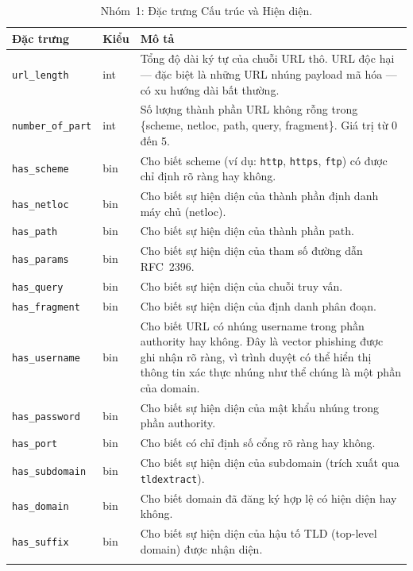 \documentclass[a4paper,12pt]{article}
\begin{document}
\begin{longtable}{p{4.5cm}p{1.5cm}p{7cm}}
\toprule
\textbf{Đặc trưng} & \textbf{Kiểu} & \textbf{Mô tả} \\
\midrule
\endhead
\texttt{url\_length}       & int   & Tổng độ dài ký tự của chuỗi URL thô. URL độc hại --- đặc biệt là những URL nhúng payload mã hóa --- có xu hướng dài bất thường. \\
\texttt{number\_of\_part}  & int   & Số lượng thành phần URL không rỗng trong \{scheme, netloc, path, query, fragment\}. Giá trị từ 0 đến 5. \\
\texttt{has\_scheme}       & bin   & Cho biết scheme (ví dụ: \texttt{http}, \texttt{https}, \texttt{ftp}) có được chỉ định rõ ràng hay không. \\
\texttt{has\_netloc}       & bin   & Cho biết sự hiện diện của thành phần định danh máy chủ (netloc). \\
\texttt{has\_path}         & bin   & Cho biết sự hiện diện của thành phần path. \\
\texttt{has\_params}       & bin   & Cho biết sự hiện diện của tham số đường dẫn RFC~2396. \\
\texttt{has\_query}        & bin   & Cho biết sự hiện diện của chuỗi truy vấn. \\
\texttt{has\_fragment}     & bin   & Cho biết sự hiện diện của định danh phân đoạn. \\
\texttt{has\_username}     & bin   & Cho biết URL có nhúng username trong phần authority hay không. Đây là vector phishing được ghi nhận rõ ràng, vì trình duyệt có thể hiển thị thông tin xác thực nhúng như thể chúng là một phần của domain. \\
\texttt{has\_password}     & bin   & Cho biết sự hiện diện của mật khẩu nhúng trong phần authority. \\
\texttt{has\_port}         & bin   & Cho biết có chỉ định số cổng rõ ràng hay không. \\
\texttt{has\_subdomain}    & bin   & Cho biết sự hiện diện của subdomain (trích xuất qua \texttt{tldextract}). \\
\texttt{has\_domain}       & bin   & Cho biết domain đã đăng ký hợp lệ có hiện diện hay không. \\
\texttt{has\_suffix}       & bin   & Cho biết sự hiện diện của hậu tố TLD (top-level domain) được nhận diện. \\
\bottomrule
\caption{Nhóm~1: Đặc trưng Cấu trúc và Hiện diện.}
\label{tab:structural}
\end{longtable}
\end{document}

